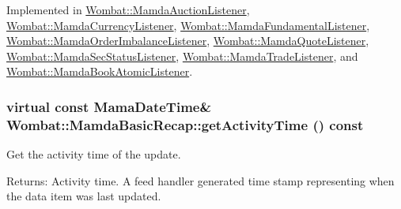 Implemented in \hyperlink{classWombat_1_1MamdaAuctionListener_147fd8bbd8cdd66a644d84146e9fda34}{Wombat::Mamda\-Auction\-Listener}, \hyperlink{classWombat_1_1MamdaCurrencyListener_8a309624a9e76fb5e943560e17dd7bf8}{Wombat::Mamda\-Currency\-Listener}, \hyperlink{classWombat_1_1MamdaFundamentalListener_b375ecf594f9fd285f046d698da763af}{Wombat::Mamda\-Fundamental\-Listener}, \hyperlink{classWombat_1_1MamdaOrderImbalanceListener_6f070f42d8d7bf1b6260014835020c11}{Wombat::Mamda\-Order\-Imbalance\-Listener}, \hyperlink{classWombat_1_1MamdaQuoteListener_50550dbdc63d6a518052710d8414387c}{Wombat::Mamda\-Quote\-Listener}, \hyperlink{classWombat_1_1MamdaSecStatusListener_6d515670385459d9ac8165a9edc9f364}{Wombat::Mamda\-Sec\-Status\-Listener}, \hyperlink{classWombat_1_1MamdaTradeListener_a228f95b1fd47f62b1d57e88c6b6482a}{Wombat::Mamda\-Trade\-Listener}, and \hyperlink{classWombat_1_1MamdaBookAtomicListener_22cb444aedd516da0ea66a2a6ca85d39}{Wombat::Mamda\-Book\-Atomic\-Listener}.\hypertarget{classWombat_1_1MamdaBasicRecap_9444ec99a8cfd96a08a7c34a489bd0df}{
\subsubsection[getActivityTime]{\setlength{\rightskip}{0pt plus 5cm}virtual const Mama\-Date\-Time\& Wombat::Mamda\-Basic\-Recap::get\-Activity\-Time () const}}
\label{classWombat_1_1MamdaBasicRecap_9444ec99a8cfd96a08a7c34a489bd0df}


Get the activity time of the update. 

\begin{Desc}
\item[Returns:]Activity time. A feed handler generated time stamp representing when the data item was last updated. \end{Desc}


